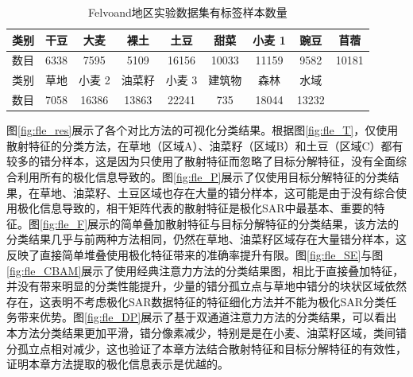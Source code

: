 \begin{table}[h]
    \caption{Felvoand地区实验数据集有标签样本数量}
    \begin{tabular}{|c|c|c|c|c|c|c|c|c|}
        \hline 类别 & 干豆   & 大麦    & 裸土    & 土豆    & 甜菜    & 小麦 1  & 豌豆    & 苜蓿
        \\
        \hline 数目 & 6338 & 7595  & 5109  & 16156 & 10033 & 11159 & 9582  & 10181 \\
        \hline 类别 & 草地   & 小麦 2  & 油菜籽   & 小麦 3  & 建筑物   & 森林    & 水域    &       \\
        \hline 数目 & 7058 & 16386 & 13863 & 22241 & 735   & 18044 & 13232 &       \\
        \hline
    \end{tabular}
    \label{flevoland_smaple}
\end{table}

图\ref{fig:fle_res}展示了各个对比方法的可视化分类结果。根据图\ref{fig:fle_T}，仅使用散射特征的分类方法，在草地（区域A）、油菜籽（区域B）和土豆（区域C）都有较多的错分样本，这是因为只使用了散射特征而忽略了目标分解特征，没有全面综合利用所有的极化信息导致的。图\ref{fig:fle_P}展示了仅使用目标分解特征的分类结果，在草地、油菜籽、土豆区域也存在大量的错分样本，这可能是由于没有综合使用极化信息导致的，相干矩阵代表的散射特征是极化SAR中最基本、重要的特征。图\ref{fig:fle_F}展示的简单叠加散射特征与目标分解特征的分类结果，该方法的分类结果几乎与前两种方法相同，仍然在草地、油菜籽区域存在大量错分样本，这反映了直接简单堆叠使用极化特征带来的准确率提升有限。图\ref{fig:fle_SE}与图\ref{fig:fle_CBAM}展示了使用经典注意力方法的分类结果图，相比于直接叠加特征，并没有带来明显的分类性能提升，少量的错分孤立点与草地中错分的块状区域依然存在，这表明不考虑极化SAR数据特征的特征细化方法并不能为极化SAR分类任务带来优势。图\ref{fig:fle_DP}展示了基于双通道注意力方法的分类结果，可以看出本方法分类结果更加平滑，错分像素减少，特别是是在小麦、油菜籽区域，类间错分孤立点相对减少，这也验证了本章方法结合散射特征和目标分解特征的有效性，证明本章方法提取的极化信息表示是优越的。


